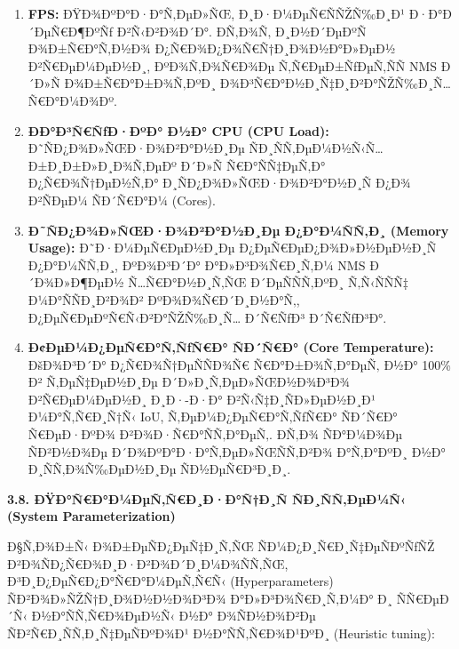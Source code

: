 \documentclass[]{article}
\begin{document}
\begin{enumerate}
\def\labelenumi{\arabic{enumi}.}
\item
  \textbf{FPS:} ÐŸÐ¾ÐºÐ°Ð·Ð°Ñ‚ÐµÐ»ÑŒ, Ð¸Ð·Ð¼ÐµÑ€ÑÑŽÑ‰Ð¸Ð¹ Ð·Ð°Ð´ÐµÑ€Ð¶ÐºÑƒ Ð²Ñ‹Ð²Ð¾Ð´Ð°. Ð­Ñ‚Ð¾Ñ‚ Ð¸Ð½Ð´ÐµÐºÑ Ð¾Ð±Ñ€Ð°Ñ‚Ð½Ð¾ Ð¿Ñ€Ð¾Ð¿Ð¾Ñ€Ñ†Ð¸Ð¾Ð½Ð°Ð»ÐµÐ½ Ð²Ñ€ÐµÐ¼ÐµÐ½Ð¸, ÐºÐ¾Ñ‚Ð¾Ñ€Ð¾Ðµ Ñ‚Ñ€ÐµÐ±ÑƒÐµÑ‚ÑÑ NMS Ð´Ð»Ñ Ð¾Ð±Ñ€Ð°Ð±Ð¾Ñ‚ÐºÐ¸ Ð¾Ð³Ñ€Ð°Ð½Ð¸Ñ‡Ð¸Ð²Ð°ÑŽÑ‰Ð¸Ñ… Ñ€Ð°Ð¼Ð¾Ðº.
\item
  \textbf{ÐÐ°Ð³Ñ€ÑƒÐ·ÐºÐ° Ð½Ð° CPU (CPU Load):} Ð˜ÑÐ¿Ð¾Ð»ÑŒÐ·Ð¾Ð²Ð°Ð½Ð¸Ðµ ÑÐ¸ÑÑ‚ÐµÐ¼Ð½Ñ‹Ñ… Ð±Ð¸Ð±Ð»Ð¸Ð¾Ñ‚ÐµÐº Ð´Ð»Ñ Ñ€Ð°ÑÑ‡ÐµÑ‚Ð° Ð¿Ñ€Ð¾Ñ†ÐµÐ½Ñ‚Ð° Ð¸ÑÐ¿Ð¾Ð»ÑŒÐ·Ð¾Ð²Ð°Ð½Ð¸Ñ Ð¿Ð¾ Ð²ÑÐµÐ¼ ÑÐ´Ñ€Ð°Ð¼ (Cores).
\item
  \textbf{Ð˜ÑÐ¿Ð¾Ð»ÑŒÐ·Ð¾Ð²Ð°Ð½Ð¸Ðµ Ð¿Ð°Ð¼ÑÑ‚Ð¸ (Memory Usage):} Ð˜Ð·Ð¼ÐµÑ€ÐµÐ½Ð¸Ðµ Ð¿ÐµÑ€ÐµÐ¿Ð¾Ð»Ð½ÐµÐ½Ð¸Ñ Ð¿Ð°Ð¼ÑÑ‚Ð¸, ÐºÐ¾Ð³Ð´Ð° Ð°Ð»Ð³Ð¾Ñ€Ð¸Ñ‚Ð¼ NMS Ð´Ð¾Ð»Ð¶ÐµÐ½ Ñ…Ñ€Ð°Ð½Ð¸Ñ‚ÑŒ Ð´ÐµÑÑÑ‚ÐºÐ¸ Ñ‚Ñ‹ÑÑÑ‡ Ð¼Ð°ÑÑÐ¸Ð²Ð¾Ð² ÐºÐ¾Ð¾Ñ€Ð´Ð¸Ð½Ð°Ñ‚, Ð¿ÐµÑ€ÐµÐºÑ€Ñ‹Ð²Ð°ÑŽÑ‰Ð¸Ñ… Ð´Ñ€ÑƒÐ³ Ð´Ñ€ÑƒÐ³Ð°.
\item
  \textbf{Ð¢ÐµÐ¼Ð¿ÐµÑ€Ð°Ñ‚ÑƒÑ€Ð° ÑÐ´Ñ€Ð° (Core Temperature):} ÐšÐ¾Ð³Ð´Ð° Ð¿Ñ€Ð¾Ñ†ÐµÑÑÐ¾Ñ€ Ñ€Ð°Ð±Ð¾Ñ‚Ð°ÐµÑ‚ Ð½Ð° 100\% Ð² Ñ‚ÐµÑ‡ÐµÐ½Ð¸Ðµ Ð´Ð»Ð¸Ñ‚ÐµÐ»ÑŒÐ½Ð¾Ð³Ð¾ Ð²Ñ€ÐµÐ¼ÐµÐ½Ð¸ Ð¸Ð·-Ð·Ð° Ð²Ñ‹Ñ‡Ð¸ÑÐ»ÐµÐ½Ð¸Ð¹ Ð¼Ð°Ñ‚Ñ€Ð¸Ñ†Ñ‹ IoU, Ñ‚ÐµÐ¼Ð¿ÐµÑ€Ð°Ñ‚ÑƒÑ€Ð° ÑÐ´Ñ€Ð° Ñ€ÐµÐ·ÐºÐ¾ Ð²Ð¾Ð·Ñ€Ð°ÑÑ‚Ð°ÐµÑ‚. Ð­Ñ‚Ð¾ ÑÐ°Ð¼Ð¾Ðµ ÑÐ²Ð½Ð¾Ðµ Ð´Ð¾ÐºÐ°Ð·Ð°Ñ‚ÐµÐ»ÑŒÑÑ‚Ð²Ð¾ Ð°Ñ‚Ð°ÐºÐ¸ Ð½Ð° Ð¸ÑÑ‚Ð¾Ñ‰ÐµÐ½Ð¸Ðµ ÑÐ½ÐµÑ€Ð³Ð¸Ð¸.
\end{enumerate}

\textbf{3.8. ÐŸÐ°Ñ€Ð°Ð¼ÐµÑ‚Ñ€Ð¸Ð·Ð°Ñ†Ð¸Ñ ÑÐ¸ÑÑ‚ÐµÐ¼Ñ‹ (System Parameterization)}

Ð§Ñ‚Ð¾Ð±Ñ‹ Ð¾Ð±ÐµÑÐ¿ÐµÑ‡Ð¸Ñ‚ÑŒ ÑÐ¼Ð¿Ð¸Ñ€Ð¸Ñ‡ÐµÑÐºÑƒÑŽ Ð²Ð¾ÑÐ¿Ñ€Ð¾Ð¸Ð·Ð²Ð¾Ð´Ð¸Ð¼Ð¾ÑÑ‚ÑŒ, Ð³Ð¸Ð¿ÐµÑ€Ð¿Ð°Ñ€Ð°Ð¼ÐµÑ‚Ñ€Ñ‹ (Hyperparameters) ÑÐ²Ð¾Ð»ÑŽÑ†Ð¸Ð¾Ð½Ð½Ð¾Ð³Ð¾ Ð°Ð»Ð³Ð¾Ñ€Ð¸Ñ‚Ð¼Ð° Ð¸ ÑÑ€ÐµÐ´Ñ‹ Ð½Ð°ÑÑ‚Ñ€Ð¾ÐµÐ½Ñ‹ Ð½Ð° Ð¾ÑÐ½Ð¾Ð²Ðµ ÑÐ²Ñ€Ð¸ÑÑ‚Ð¸Ñ‡ÐµÑÐºÐ¾Ð¹ Ð½Ð°ÑÑ‚Ñ€Ð¾Ð¹ÐºÐ¸ (Heuristic tuning):
\end{document}
